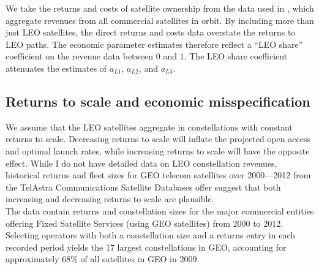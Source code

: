 \documentclass[12pt]{article}
\begin{document}
We take the returns and costs of satellite ownership from the data used in \citet{wienzierl2018}, which aggregate revenues from all commercial satellites in orbit. By including more than just LEO satellites, the direct returns and costs data overstate the returns to LEO paths. The economic parameter estimates therefore reflect a ``LEO share'' coefficient on the revenue data between $0$ and $1$. The LEO share coefficient attenuates the estimates of $a_{L 1}$, $a_{L 2}$, and $a_{L 3}$.

\subsection{Returns to scale and economic misspecification}

We assume that the LEO satellites aggregate in constellations with constant returns to scale. Decreasing returns to scale will inflate the projected open access and optimal launch rates, while increasing returns to scale will have the opposite effect. While I do not have detailed data on LEO constellation revenues, historical returns and fleet sizes for GEO telecom satellites over 2000---2012 from the TelAstra Communications Satellite Databases \citep{ta17data} offer suggest that both increasing and decreasing returns to scale are plausible. \\

The data contain returns and constellation sizes for the major commercial entities offering Fixed Satellite Services (using GEO satellites) from 2000 to 2012. Selecting operators with both a constellation size and a returns entry in each recorded period yields the 17 largest constellations in GEO, accounting for approximately 68\% of all satellites in GEO in 2009. 
\end{document}
